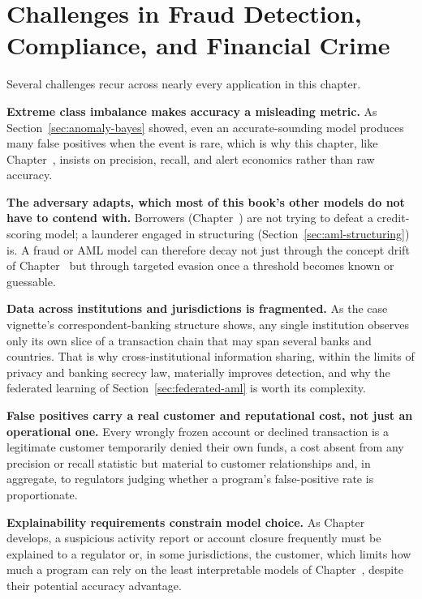 \documentclass[../ai_in_finance]{subfiles}
\begin{document}
\section{Challenges in Fraud Detection, Compliance, and Financial Crime}

Several challenges recur across nearly every application in this chapter.

\textbf{Extreme class imbalance makes accuracy a misleading metric.} As Section~\ref{sec:anomaly-bayes} showed, even an accurate-sounding model produces many false positives when the event is rare, which is why this chapter, like Chapter~, insists on precision, recall, and alert economics rather than raw accuracy.

\textbf{The adversary adapts, which most of this book's other models do not have to contend with.} Borrowers (Chapter~) are not trying to defeat a credit-scoring model; a launderer engaged in structuring (Section~\ref{sec:aml-structuring}) is. A fraud or AML model can therefore decay not just through the concept drift of Chapter~ but through targeted evasion once a threshold becomes known or guessable.

\textbf{Data across institutions and jurisdictions is fragmented.} As the case vignette's correspondent-banking structure shows, any single institution observes only its own slice of a transaction chain that may span several banks and countries. That is why cross-institutional information sharing, within the limits of privacy and banking secrecy law, materially improves detection, and why the federated learning of Section~\ref{sec:federated-aml} is worth its complexity.

\textbf{False positives carry a real customer and reputational cost, not just an operational one.} Every wrongly frozen account or declined transaction is a legitimate customer temporarily denied their own funds, a cost absent from any precision or recall statistic but material to customer relationships and, in aggregate, to regulators judging whether a program's false-positive rate is proportionate.

\textbf{Explainability requirements constrain model choice.} As Chapter~ develops, a suspicious activity report or account closure frequently must be explained to a regulator or, in some jurisdictions, the customer, which limits how much a program can rely on the least interpretable models of Chapter~, despite their potential accuracy advantage.
\end{document}
